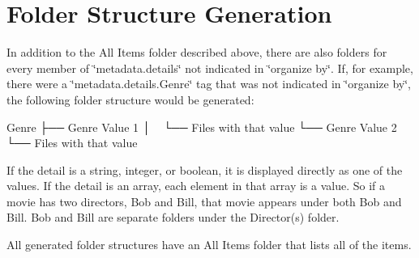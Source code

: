 \section*{Folder Structure Generation}

In addition to the {\ttfamily All Items} folder described above, there are also folders for every member of {\ttfamily \char`\"{}metadata.\-details\char`\"{}} not indicated in {\ttfamily \char`\"{}organize by\char`\"{}}. If, for example, there were a {\ttfamily \char`\"{}metadata.\-details.\-Genre\char`\"{}} tag that was not indicated in {\ttfamily \char`\"{}organize by\char`\"{}}, the following folder structure would be generated\-: \begin{DoxyVerb}Genre
├── Genre Value 1
│   └── Files with that value
└── Genre Value 2
    └── Files with that value
\end{DoxyVerb}


If the detail is a string, integer, or boolean, it is displayed directly as one of the values. If the detail is an array, each element in that array is a value. So if a movie has two directors, Bob and Bill, that movie appears under both Bob and Bill. Bob and Bill are separate folders under the Director(s) folder.

All generated folder structures have an All Items folder that lists all of the items. 